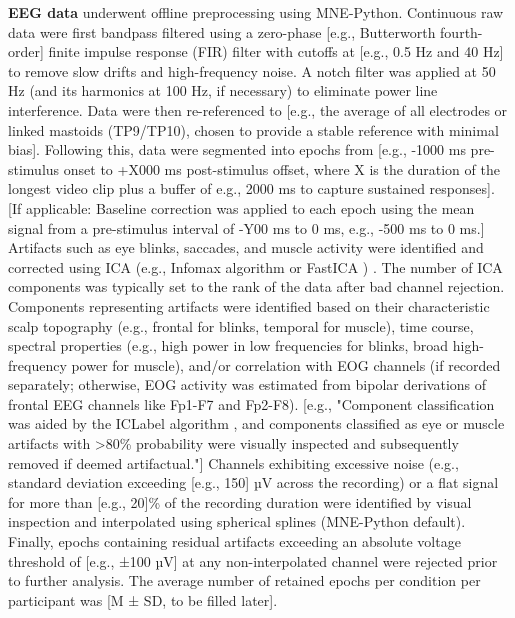 \textbf{\gls{EEG} data} underwent offline preprocessing using MNE-Python. Continuous raw data were first bandpass filtered using a zero-phase [e.g., Butterworth fourth-order] finite impulse response (FIR) filter with cutoffs at [e.g., 0.5 Hz and 40 Hz] to remove slow drifts and high-frequency noise. A notch filter was applied at 50 Hz (and its harmonics at 100 Hz, if necessary) to eliminate power line interference. Data were then re-referenced to [e.g., the average of all electrodes or linked mastoids (TP9/TP10), chosen to provide a stable reference with minimal bias]. Following this, data were segmented into epochs from [e.g., -1000 ms pre-stimulus onset to +X000 ms post-stimulus offset, where X is the duration of the longest video clip plus a buffer of e.g., 2000 ms to capture sustained responses]. [If applicable: Baseline correction was applied to each epoch using the mean signal from a pre-stimulus interval of -Y00 ms to 0 ms, e.g., -500 ms to 0 ms.]
Artifacts such as eye blinks, saccades, and muscle activity were identified and corrected using \gls{ICA} (e.g., Infomax algorithm \parencite{bellIndependentComponentAnalysis1995} or FastICA \parencite{hyvarinenFastRobustFixedPoint1997}) \parencite{delormeEEGLABOpenSource2004}. The number of ICA components was typically set to the rank of the data after bad channel rejection. Components representing artifacts were identified based on their characteristic scalp topography (e.g., frontal for blinks, temporal for muscle), time course, spectral properties (e.g., high power in low frequencies for blinks, broad high-frequency power for muscle), and/or correlation with EOG channels (if recorded separately; otherwise, EOG activity was estimated from bipolar derivations of frontal EEG channels like Fp1-F7 and Fp2-F8). [e.g., "Component classification was aided by the ICLabel algorithm \parencite{pion-tonachiniICLabelAutomatedEEG2019}, and components classified as eye or muscle artifacts with >80\% probability were visually inspected and subsequently removed if deemed artifactual."]
Channels exhibiting excessive noise (e.g., standard deviation exceeding [e.g., 150] µV across the recording) or a flat signal for more than [e.g., 20]\% of the recording duration were identified by visual inspection and interpolated using spherical splines (MNE-Python default). Finally, epochs containing residual artifacts exceeding an absolute voltage threshold of [e.g., ±100 µV] at any non-interpolated channel were rejected prior to further analysis. The average number of retained epochs per condition per participant was [M ± SD, to be filled later].

